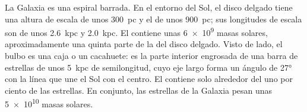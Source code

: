 La Galaxia es una espiral barrada. En el entorno del Sol, el disco delgado
tiene una altura de escala de unos \qty{300}{pc} y el  de
unos \qty{900}{pc}; sus longitudes de escala son de unos \qty{2.6}{kpc} y
\qty{2.0}{kpc}. El  contiene unas \num{6e9} masas solares,
aproximadamente una quinta parte de la del disco delgado. Visto de lado, el bulbo es una caja
o un cacahuete: es la parte interior engrosada de una barra de estrellas de unos
\qty{5}{kpc} de semilongitud, cuyo eje largo forma un ángulo de
\ang{27} con la línea que une el Sol con el centro. El  contiene
solo alrededor del uno por ciento de las estrellas. En conjunto, las estrellas de la Galaxia
pesan unas \num{5e10} masas solares.

